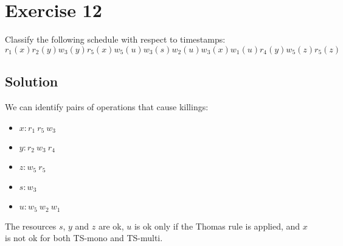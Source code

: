 \section{Exercise 12}

Classify the following schedule with respect to timestamps: 
\[r_1(x) r_2(y) w_3(y) r_5(x) w_5(u) w_3(s) w_2(u) w_3(x) w_1(u) r_4(y) w_5(z) r_5(z)\]

\subsection*{Solution}
We can identify pairs of operations that cause killings:
\begin{itemize}
    \item $x: r_1 \: r_5 \: w_3$
    \item $y: r_2 \: w_3 \: r_4$
    \item $z: w_5 \: r_5$
    \item $s: w_3$
    \item $u: w_5 \: w_2 \: w_1$
\end{itemize}
The resources $s$, $y$ and $z$ are ok, $u$ is ok only if the Thomas rule is applied, and $x$ is not ok for both TS-mono and TS-multi. 